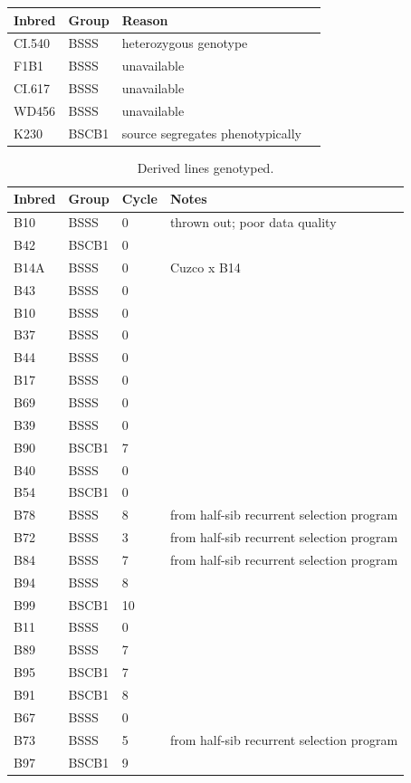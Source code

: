 \begin{table}
	\begin{tabular}{llll}
	Inbred & Group & Reason   \\ \hline
	CI.540 & BSSS & heterozygous genotype  \\ 
	F1B1 & BSSS & unavailable   \\ 
	CI.617 & BSSS & unavailable   \\ 
	WD456 & BSSS & unavailable   \\ 
	K230 & BSCB1 & source segregates phenotypically   \\ 
	\end{tabular}
\label{tab:founders}
\end{table}

\clearpage
\begin{table}
\caption{Derived lines genotyped. }	\begin{tabular}{llll}
	Inbred & Group & Cycle & Notes \\ \hline
	B10 & BSSS & 0 & thrown out; poor data quality \\ 
	B42 & BSCB1 & 0 &  \\ 
	B14A & BSSS & 0 & Cuzco x B14 \\ 
	B43 & BSSS & 0 &  \\ 
	B10 & BSSS & 0 &  \\ 
	B37 & BSSS & 0 &  \\ 
	B44 & BSSS & 0 &  \\ 
	B17 & BSSS & 0 &  \\ 
	B69 & BSSS & 0 &  \\ 
	B39 & BSSS & 0 &  \\ 
	B90 & BSCB1 & 7 &  \\ 
	B40 & BSSS & 0 &  \\ 
	B54 & BSCB1 & 0 &  \\ 
	B78 & BSSS & 8 & from half-sib recurrent selection program \\ 
	B72 & BSSS & 3 & from half-sib recurrent selection program \\ 
	B84 & BSSS & 7 & from half-sib recurrent selection program \\ 
	B94 & BSSS & 8 &  \\ 
	B99 & BSCB1 & 10 &  \\ 
	B11 & BSSS & 0 &  \\ 
	B89 & BSSS & 7 &  \\ 
	B95 & BSCB1 & 7 &  \\ 
	B91 & BSCB1 & 8 &  \\ 
	B67 & BSSS & 0 &  \\ 
	B73 & BSSS & 5 & from half-sib recurrent selection program \\ 
	B97 & BSCB1 & 9 &  \\ 
	\end{tabular}
	\label{tab:derived}  %
\end{table}

